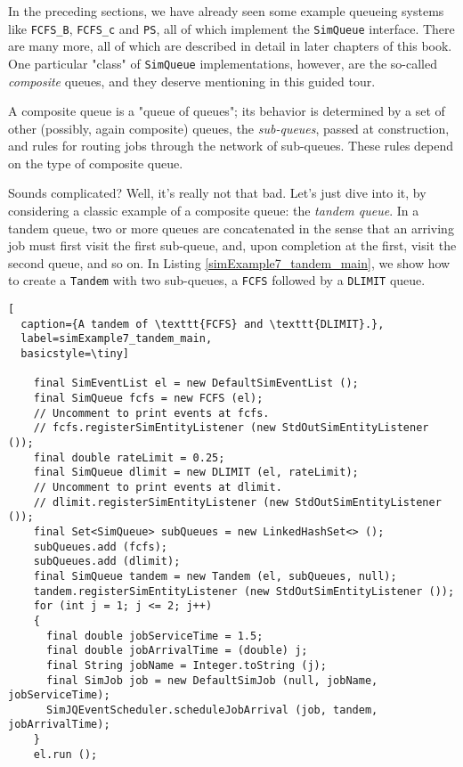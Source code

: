 In the preceding sections,
  we have already seen some example queueing systems
  like \lstinline|FCFS_B|, \lstinline|FCFS_c|
  and \lstinline|PS|,
  all of which implement the \lstinline|SimQueue|
  interface.
There are many more, all of which are described in detail
  in later chapters of this book.
One particular "class" of \lstinline|SimQueue| implementations,
  however, are the so-called {\em composite\/} queues,
  and they deserve mentioning in this guided tour.

A composite queue is a "queue of queues";
  its behavior is determined by a set of other
  (possibly, again composite) queues,
  the {\em sub-queues\/},
  passed at construction,
  and rules for routing jobs through the network
  of sub-queues.
These rules depend on the type of composite queue.

Sounds complicated?
Well, it's really not that bad.
Let's just dive into it,
  by considering a classic example of a composite queue:
  the {\em tandem queue}.
In a tandem queue,
  two or more queues
  are concatenated in the
  sense that an arriving job
  must first visit the first sub-queue,
  and, upon completion at the first,
  visit the second queue, and so on.
In Listing \ref{simExample7_tandem_main},
  we show how to create a \lstinline|Tandem|
  with two sub-queues,
  a \lstinline|FCFS|
  followed by a \lstinline|DLIMIT| queue.

\begin{lstfloat}
\begin{lstlisting}[
  caption={A tandem of \texttt{FCFS} and \texttt{DLIMIT}.},
  label=simExample7_tandem_main,
  basicstyle=\tiny]

    final SimEventList el = new DefaultSimEventList ();
    final SimQueue fcfs = new FCFS (el);
    // Uncomment to print events at fcfs.
    // fcfs.registerSimEntityListener (new StdOutSimEntityListener ());
    final double rateLimit = 0.25;
    final SimQueue dlimit = new DLIMIT (el, rateLimit);
    // Uncomment to print events at dlimit.
    // dlimit.registerSimEntityListener (new StdOutSimEntityListener ());
    final Set<SimQueue> subQueues = new LinkedHashSet<> ();
    subQueues.add (fcfs);
    subQueues.add (dlimit);
    final SimQueue tandem = new Tandem (el, subQueues, null);
    tandem.registerSimEntityListener (new StdOutSimEntityListener ());
    for (int j = 1; j <= 2; j++)
    {
      final double jobServiceTime = 1.5;
      final double jobArrivalTime = (double) j;
      final String jobName = Integer.toString (j);
      final SimJob job = new DefaultSimJob (null, jobName, jobServiceTime);
      SimJQEventScheduler.scheduleJobArrival (job, tandem, jobArrivalTime);
    }
    el.run ();

\end{lstlisting}
\end{lstfloat}

